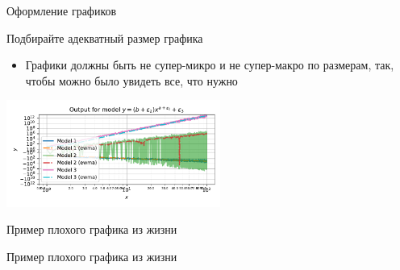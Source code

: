 \documentclass[fleqn, xcolor=x11names]{beamer}
\begin{document}
\begin{section}{Оформление графиков}
\begin{frame}{Подбирайте адекватный размер графика}
    \begin{itemize}
        \item Графики должны быть не супер-микро и не супер-макро по размерам, так, чтобы можно было увидеть все, что нужно
    \end{itemize}

	\begin{center}
		\includegraphics[height=3.5cm]{bad_plots/no_resize_plot.pdf}
	\end{center}
\end{frame}

\begin{frame}{Пример плохого графика из жизни}
	\begin{center}
	\end{center}
\end{frame}

\begin{frame}{Пример плохого графика из жизни}
	\begin{center}
	\end{center}
\end{frame}


\end{section}
\end{document}
